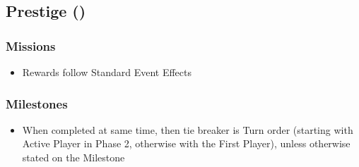 \documentclass[10pt]{article}
\begin{document}
\subsection*{Prestige (\prestige) }

\subsubsection*{Missions}
\begin{itemize}
	\item Rewards follow Standard Event Effects
\end{itemize}

\subsubsection*{Milestones}
\begin{itemize}
	\item When completed at same time, then tie breaker is Turn order (starting with Active Player in Phase 2, otherwise with the First Player), unless otherwise stated on the Milestone
\end{itemize}
\end{document}

